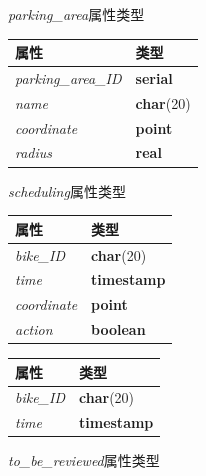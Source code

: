 \begin{figure}[!htp]
    \begin{minipage}{0.33\textwidth}
      \centering
      \caption{\textit{parking\_area}属性类型}
      \label{tab:parkingarea}
      \begin{tabular}{ll}\toprule
        属性&类型\\\midrule
       \textit{parking\_area\_ID}&\textbf{serial}\\
       \textit{name}&\textbf{char}(20)\\
       \textit{coordinate}&\textbf{point}\\
       \textit{radius}&\textbf{real}\\
       \bottomrule
      \end{tabular}
    \end{minipage}\hfill
    \begin{minipage}{0.33\textwidth}
      \centering
      \caption{\textit{scheduling}属性类型}
      \label{tab:scheduling}
      \begin{tabular}{ll}\toprule
        属性&类型\\\midrule
       \textit{bike\_ID}&\textbf{char}(20)\\
       \textit{time}&\textbf{timestamp}\\
       \textit{coordinate}&\textbf{point}\\
       \textit{action}&\textbf{boolean}\\
       \bottomrule
      \end{tabular}
    \end{minipage}\hfill
    \begin{minipage}{0.33\textwidth}
      \centering
      \caption{\textit{to\_be\_reviewed}属性类型}
      \label{tab:tobereviewed}
      \begin{tabular}{ll}\toprule
        属性&类型\\\midrule
       \textit{bike\_ID}&\textbf{char}(20)\\
       \textit{time}&\textbf{timestamp}\\
       \bottomrule
      \end{tabular}
    \end{minipage}\hfill
  \end{figure}

